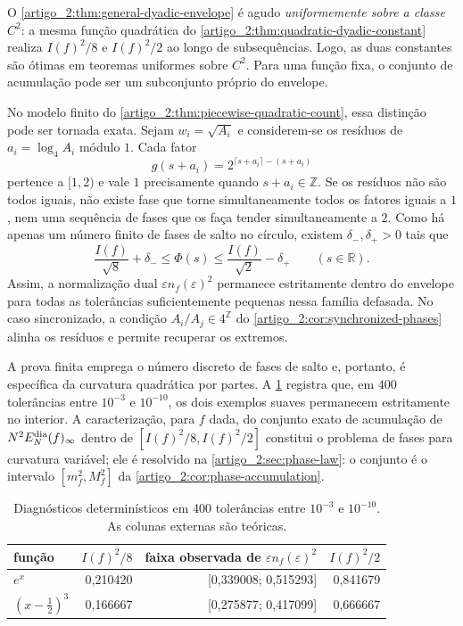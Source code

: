 \begin{remark}\label{map:artigo_2:12.4}
\label{artigo_2:rem:envelope-not-pointwise}
O \cref{artigo_2:thm:general-dyadic-envelope} é agudo \emph{uniformemente sobre a
classe} $C^2$: a mesma função quadrática do
\cref{artigo_2:thm:quadratic-dyadic-constant} realiza $I(f)^2/8$ e $I(f)^2/2$ ao longo
de subsequências. Logo, as duas constantes são ótimas em teoremas uniformes
sobre $C^2$. Para uma função fixa, o conjunto de acumulação pode ser um
subconjunto próprio do envelope.

No modelo finito do \cref{artigo_2:thm:piecewise-quadratic-count}, essa distinção pode
ser tornada exata. Sejam $w_i=\sqrt{A_i}$ e considerem-se os resíduos de
$a_i=\log_4A_i$ módulo $1$. Cada fator
\[
 g(s+a_i)=2^{\lceil s+a_i\rceil-(s+a_i)}
\]
pertence a $[1,2)$ e vale $1$ precisamente quando $s+a_i\in\mathbb Z$. Se os
resíduos não são todos iguais, não existe fase que torne simultaneamente
todos os fatores iguais a $1$, nem uma sequência de fases que os faça tender
simultaneamente a $2$. Como há apenas um número finito de fases de salto no
círculo, existem $\delta_-,\delta_+>0$ tais que
\[
 \frac{I(f)}{\sqrt8}+\delta_-
 \le \Phi(s)
 \le \frac{I(f)}{\sqrt2}-\delta_+
 \qquad(s\in\mathbb R).
\]
Assim, a normalização dual $\varepsilon n_f(\varepsilon)^2$ permanece
estritamente dentro do envelope para todas as tolerâncias suficientemente
pequenas nessa família defasada. No caso sincronizado, a condição
$A_i/A_j\in4^{\mathbb Z}$ do \cref{artigo_2:cor:synchronized-phases} alinha os
resíduos e permite recuperar os extremos.

A prova finita emprega o número discreto de fases de salto e, portanto, é
específica da curvatura quadrática por partes. A
\cref{artigo_2:tab:smooth-diagnostics} registra que, em $400$ tolerâncias entre
$10^{-3}$ e $10^{-10}$, os dois exemplos suaves permanecem estritamente no
interior. A caracterização, para $f$ dada, do conjunto exato de acumulação de
$N^2E_N^{\rm dia}(f)_\infty$ dentro de
$[I(f)^2/8,\allowbreak I(f)^2/2]$ constitui o problema de fases para curvatura
variável; ele é resolvido na \cref{artigo_2:sec:phase-law}: o conjunto é o
intervalo $[m_f^2,M_f^2]$ da \cref{artigo_2:cor:phase-accumulation}.
\end{remark}

\begin{table}[t]
 \centering
 \caption{Diagnósticos determinísticos em 400 tolerâncias entre
 $10^{-3}$ e $10^{-10}$. As colunas externas são teóricas.}
 \label{artigo_2:tab:smooth-diagnostics}
 \small
 \begin{tabular}{lrrr}
\toprule
função & $I(f)^2/8$ & faixa observada de $\varepsilon n_f(\varepsilon)^2$ & $I(f)^2/2$ \\
\midrule
$e^x$ & 0{,}210420 & [0{,}339008; 0{,}515293] & 0{,}841679 \\
$(x-\frac{1}{2})^3$ & 0{,}166667 & [0{,}275877; 0{,}417099] & 0{,}666667 \\
\bottomrule
\end{tabular}

\end{table}

